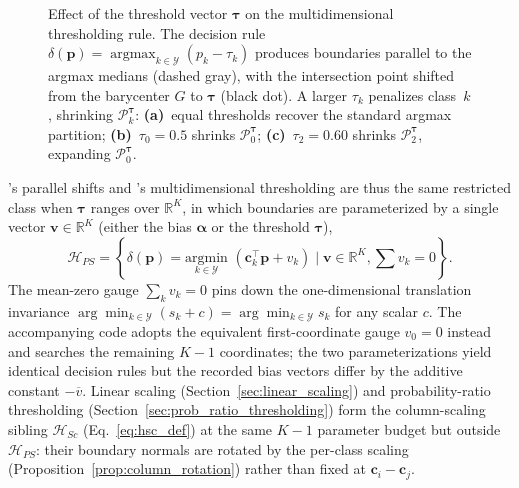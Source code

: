 \begin{figure}[H]
    \centering
    \resizebox{\textwidth}{!}{}
    \caption{Effect of the threshold vector $\boldsymbol{\tau}$ on the multidimensional thresholding rule. The decision rule $\delta(\mathbf{p}) = \operatorname{argmax}_{k \in \mathcal{Y}} (p_k - \tau_k)$ produces boundaries parallel to the argmax medians (dashed gray), with the intersection point shifted from the barycenter $G$ to $\boldsymbol{\tau}$ (black dot). A larger $\tau_k$ penalizes class~$k$, shrinking $\mathcal{P}_k^{\boldsymbol{\tau}}$: \textbf{(a)}~equal thresholds recover the standard argmax partition; \textbf{(b)}~$\tau_0 = 0.5$ shrinks $\mathcal{P}_0^{\boldsymbol{\tau}}$; \textbf{(c)}~$\tau_2 = 0.60$ shrinks $\mathcal{P}_2^{\boldsymbol{\tau}}$, expanding $\mathcal{P}_0^{\boldsymbol{\tau}}$.}\label{fig:marchetti_thresholding}
\end{figure}

\citeauthor{obrien2008costsensitive}'s parallel shifts and \citeauthor{legnaro2025multiclass}'s multidimensional thresholding are thus the same restricted class when $\boldsymbol{\tau}$ ranges over $\mathbb{R}^K$, in which boundaries are parameterized by a single vector $\mathbf{v} \in \mathbb{R}^K$ (either the bias $\boldsymbol{\alpha}$ or the threshold $\boldsymbol{\tau}$),
\begin{equation}\label{eq:hps_def}
    \mathcal{H}_{PS} = \left\{ \delta(\mathbf{p}) = \underset{k \in \mathcal{Y}}{\mathrm{argmin}} \,\, (\mathbf{c}_k^\top \mathbf{p} + v_k) \mid \mathbf{v} \in \mathbb{R}^{K}, \sum v_k = 0 \right\}.
\end{equation}
The mean-zero gauge $\sum_k v_k = 0$ pins down the one-dimensional translation invariance $\arg\min_{k \in \mathcal{Y}}(s_k + c) = \arg\min_{k \in \mathcal{Y}} s_k$ for any scalar $c$. The accompanying code adopts the equivalent first-coordinate gauge $v_0 = 0$ instead and searches the remaining $K-1$ coordinates; the two parameterizations yield identical decision rules but the recorded bias vectors differ by the additive constant $-\overline{v}$. Linear scaling (Section~\ref{sec:linear_scaling}) and probability-ratio thresholding (Section~\ref{sec:prob_ratio_thresholding}) form the column-scaling sibling $\mathcal{H}_{Sc}$ (Eq.~\ref{eq:hsc_def}) at the same $K-1$ parameter budget but outside $\mathcal{H}_{PS}$: their boundary normals are rotated by the per-class scaling (Proposition~\ref{prop:column_rotation}) rather than fixed at $\mathbf{c}_i - \mathbf{c}_j$.

